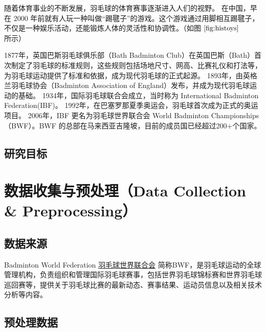 \documentclass[12pt]{article}
\begin{document}
随着体育事业的不断发展，羽毛球的体育赛事逐渐进入人们的视野。
在中国，早在 2000 年前就有人玩一种叫做“踢毽子”的游戏。这个游戏通过用脚相互踢毽子，不仅是一种娱乐活动，还能锻炼人体的灵活性和协调性。（如图 $\ref{fig:histoys}$ 所示）

1877年，英国巴斯羽毛球俱乐部（Bath Badminton Club）在英国巴斯（Bath）首次制定了羽毛球的标准规则，这些规则包括场地尺寸、网高、比赛礼仪和打法等，为羽毛球运动提供了标准和依据，成为现代羽毛球的正式起源。
1893年，由英格兰羽毛球协会（Badminton Association of England）发布，并成为现代羽毛球运动的基础。
1934年，国际羽毛球联合会成立，当时称为 International Badminton Federation(IBF)。
1992年，在巴塞罗那夏季奥运会，羽毛球首次成为正式的奥运项目。
2006年，IBF 更名为羽毛球世界联合会 World Badminton Championships（BWF）。BWF 的总部在马来西亚吉隆坡，目前的成员国已经超过200+个国家。


\subsection{研究目标}

\section{数据收集与预处理（Data Collection \& Preprocessing）}
\subsection{数据来源}
Badminton World Federation \href{https://bwfbadminton.com/zh-cn/}{羽毛球世界联合会} 简称BWF，是羽毛球运动的全球管理机构，负责组织和管理国际羽毛球赛事，包括世界羽毛球锦标赛和世界羽毛球巡回赛等，提供关于羽毛球比赛的最新动态、赛事结果、运动员信息以及相关技术分析等内容。


\subsection{预处理数据}

\end{document}
